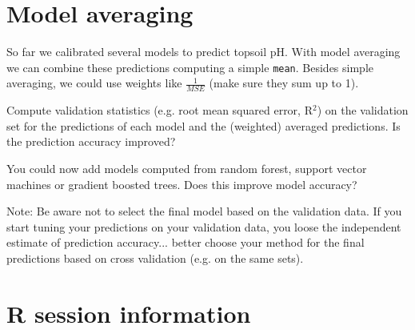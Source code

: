 \documentclass[11pt,a4paper,twoside]{article}\usepackage[]{graphicx}\usepackage[]{color}
\begin{document}
\clearpage


\section{Model averaging}

So far we calibrated several models to predict topsoil pH. With model averaging we can combine these predictions computing a simple \texttt{mean}. Besides simple averaging, we could use weights like $\frac{1}{MSE}$ (make sure they sum up to 1). 

Compute validation statistics (e.g. root mean squared error, R$^2$) on the validation set for the predictions of each model and the (weighted) averaged predictions. Is the prediction accuracy improved?

You could now add models computed from random forest, support vector machines or gradient boosted trees. Does this improve model accuracy?

\bigskip

Note: Be aware not to select the final model based on the validation data. If you start tuning your predictions on your validation data, you loose the independent estimate of prediction accuracy... better choose your method for the final predictions based on cross validation (e.g. on the same sets).  




\bigskip 
\section*{R session information}
\end{document}
